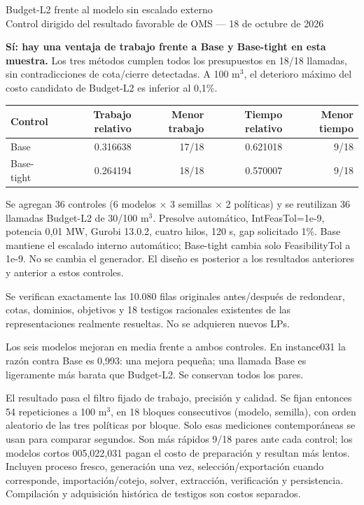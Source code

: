 \documentclass[10pt,a4paper]{article}
\begin{document}
\begin{center}{\Large Budget-L2 frente al modelo sin escalado externo}\\
Control dirigido del resultado favorable de OMS --- 18 de octubre de 2026\end{center}
\textbf{Sí: hay una ventaja de trabajo frente a Base y Base-tight en esta muestra.}
Los tres métodos cumplen todos los presupuestos en 18/18 llamadas, sin
contradicciones de cota/cierre detectadas. A 100 m$^3$, el deterioro máximo
del costo candidato de Budget-L2 es inferior al 0,1\%.

\begin{center}\begin{tabular}{lrrrr}\toprule
Control & Trabajo relativo & Menor trabajo & Tiempo relativo & Menor tiempo\\\midrule
Base & 0.316638 & 17/18 & 0.621018 & 9/18\\
Base-tight & 0.264194 & 18/18 & 0.570007 & 9/18\\
\bottomrule\end{tabular}\end{center}

Se agregan 36 controles (6 modelos $\times$ 3 semillas $\times$ 2 políticas) y se
reutilizan 36 llamadas Budget-L2 de 30/100 m$^3$. Presolve automático,
IntFeasTol=1e-9, potencia 0,01 MW, Gurobi 13.0.2, cuatro hilos, 120 s,
gap solicitado 1\%. Base mantiene el escalado interno automático;
Base-tight cambia solo FeasibilityTol a 1e-9. No se cambia el generador.
El diseño es posterior a los resultados anteriores y anterior a estos controles.

Se verifican exactamente las 10.080 filas originales antes/después de
redondear, cotas, dominios, objetivos y 18 testigos racionales existentes
de las representaciones realmente resueltas. No se adquieren nuevos LPs.

Los seis modelos mejoran en media frente a ambos controles. En instance031
la razón contra Base es 0,993: una mejora pequeña; una llamada Base es
ligeramente más barata que Budget-L2. Se conservan todos los pares.

El resultado pasa el filtro fijado de trabajo, precisión y calidad.
Se fijan entonces 54 repeticiones a 100 m$^3$, en 18 bloques consecutivos
(modelo, semilla), con orden aleatorio de las tres políticas por bloque.
Solo esas mediciones contemporáneas se usan para comparar segundos.
Son más rápidos 9/18 pares ante cada control; los modelos cortos 005,022,031
pagan el costo de preparación y resultan más lentos.
Incluyen proceso fresco, generación una vez, selección/exportación cuando
corresponde, importación/cotejo, solver, extracción, verificación y persistencia.
Compilación y adquisición histórica de testigos son costos separados.
\end{document}
